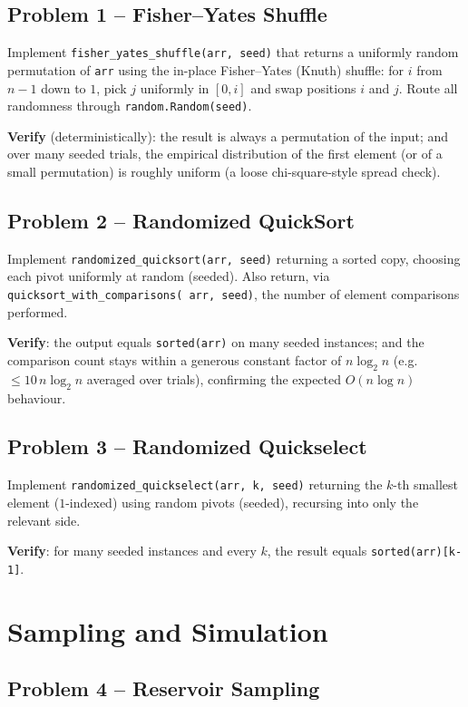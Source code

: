 \documentclass[11pt]{article}
\begin{document}
\subsection*{Problem 1 -- Fisher--Yates Shuffle}

Implement \texttt{fisher\_yates\_shuffle(arr, seed)} that returns a uniformly random
permutation of \texttt{arr} using the in-place Fisher--Yates (Knuth) shuffle: for $i$ from
$n-1$ down to $1$, pick $j$ uniformly in $[0, i]$ and swap positions $i$ and $j$. Route all
randomness through \texttt{random.Random(seed)}.

\textbf{Verify} (deterministically): the result is always a permutation of the input; and
over many seeded trials, the empirical distribution of the first element (or of a small
permutation) is roughly uniform (a loose chi-square-style spread check).

\subsection*{Problem 2 -- Randomized QuickSort}

Implement \texttt{randomized\_quicksort(arr, seed)} returning a sorted copy, choosing each
pivot uniformly at random (seeded). Also return, via \texttt{quicksort\_with\_comparisons(
arr, seed)}, the number of element comparisons performed.

\textbf{Verify}: the output equals \texttt{sorted(arr)} on many seeded instances; and the
comparison count stays within a generous constant factor of $n\log_2 n$ (e.g.\ $\le 10\,n
\log_2 n$ averaged over trials), confirming the expected $O(n\log n)$ behaviour.

\subsection*{Problem 3 -- Randomized Quickselect}

Implement \texttt{randomized\_quickselect(arr, k, seed)} returning the $k$-th smallest
element ($1$-indexed) using random pivots (seeded), recursing into only the relevant side.

\textbf{Verify}: for many seeded instances and every $k$, the result equals
\texttt{sorted(arr)[k-1]}.

\newpage
\section{Sampling and Simulation}

\subsection*{Problem 4 -- Reservoir Sampling}
\end{document}
